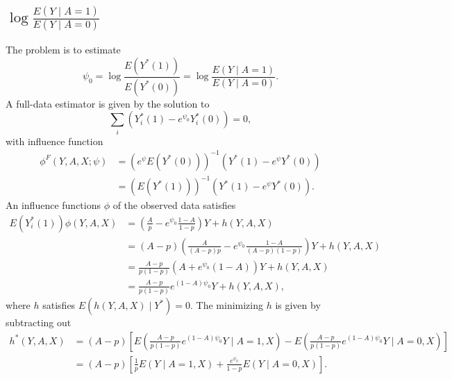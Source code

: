 \message{ !name(manuscript.tex)}\documentclass[10pt,a4paper]{amsart}
\newcommand{\EE}{E}
\newcommand{\E}[1]{\EE(Y\mid A=#1,X)}
\begin{document}
\subsection{$\log\frac{E(Y\mid A=1)}{E(Y\mid  A=0)}$} The problem is to
estimate
\[
  \psi_0 = \log\frac{E(Y^*(1))}{E(Y^*(0))}=\log\frac{\EE(Y\mid A=1)}{\EE(Y\mid A=0)}.
\]
A full-data estimator is given by the solution to
\[
  \sum_i (Y_i^*(1)-e^{\psi_0}Y_i^*(0))=0,
\]
with influence function
\begin{align*}
  \phi^F(Y,A,X;\psi) &= (e^{\psi}\EE(Y^*
                       (0)))^{-1}   (Y^*(1)-e^{\psi}Y^*(0))\\
                     &= (\EE(Y^*(1)))^{-1}   (Y^*(1)-e^{\psi}Y^*(0)).
\end{align*}
An influence functions $\phi$ of the observed data satisfies
\begin{align*}
  \EE(Y^*_i(1))\phi(Y,A,X) &= \left(\frac{A}{p} - e^{\psi_0}\frac{1-A}{1-p}\right)Y + h(Y,A,X)\\
              &= (A-p)\left(\frac{A}{(A-p)p} - e^{\psi_0}\frac{1-A}{(A-p)(1-p)}\right)Y + h(Y,A,X)\\
              &= \frac{A-p}{p(1-p)}(A + e^{\psi_0}(1-A))Y + h(Y,A,X)\\
              &= \frac{A-p}{p(1-p)}e^{(1-A)\psi_0}Y + h(Y,A,X),
\end{align*}
where $h$ satisfies $\EE(h(Y,A,X)\mid Y^*) = 0.$ The minimizing $h$ is given by
subtracting out
\begin{align*}
  h^*(Y,A,X) &= (A-p)[\EE(\frac{A-p}{p(1-p)}e^{(1-A)\psi_0}Y\mid A=1,X) - \EE(\frac{A-p}{p(1-p)}e^{(1-A)\psi_0}Y\mid A=0,X)]\\
             &= (A-p)[\frac{1}{p}\E1 + \frac{e^{\psi_0}}{1-p}\E0].
\end{align*}
\end{document}
